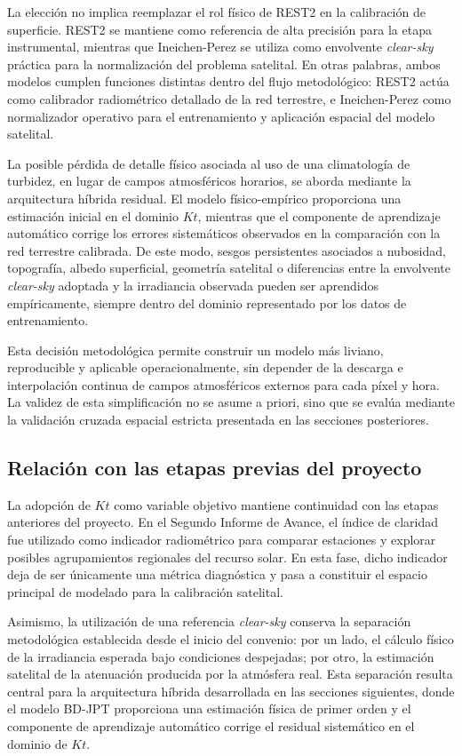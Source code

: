 \documentclass[../main.tex]{subfiles}
\begin{document}
La elección no implica reemplazar el rol físico de REST2 en la calibración de superficie. REST2 se mantiene como referencia de alta precisión para la etapa instrumental, mientras que Ineichen-Perez se utiliza como envolvente \textit{clear-sky} práctica para la normalización del problema satelital. En otras palabras, ambos modelos cumplen funciones distintas dentro del flujo metodológico: REST2 actúa como calibrador radiométrico detallado de la red terrestre, e Ineichen-Perez como normalizador operativo para el entrenamiento y aplicación espacial del modelo satelital.

La posible pérdida de detalle físico asociada al uso de una climatología de turbidez, en lugar de campos atmosféricos horarios, se aborda mediante la arquitectura híbrida residual. El modelo físico-empírico proporciona una estimación inicial en el dominio $Kt$, mientras que el componente de aprendizaje automático corrige los errores sistemáticos observados en la comparación con la red terrestre calibrada. De este modo, sesgos persistentes asociados a nubosidad, topografía, albedo superficial, geometría satelital o diferencias entre la envolvente \textit{clear-sky} adoptada y la irradiancia observada pueden ser aprendidos empíricamente, siempre dentro del dominio representado por los datos de entrenamiento.

Esta decisión metodológica permite construir un modelo más liviano, reproducible y aplicable operacionalmente, sin depender de la descarga e interpolación continua de campos atmosféricos externos para cada píxel y hora. La validez de esta simplificación no se asume a priori, sino que se evalúa mediante la validación cruzada espacial estricta presentada en las secciones posteriores.

\subsection{Relación con las etapas previas del proyecto}

La adopción de $Kt$ como variable objetivo mantiene continuidad con las etapas anteriores del proyecto. En el Segundo Informe de Avance, el índice de claridad fue utilizado como indicador radiométrico para comparar estaciones y explorar posibles agrupamientos regionales del recurso solar. En esta fase, dicho indicador deja de ser únicamente una métrica diagnóstica y pasa a constituir el espacio principal de modelado para la calibración satelital.

Asimismo, la utilización de una referencia \textit{clear-sky} conserva la separación metodológica establecida desde el inicio del convenio: por un lado, el cálculo físico de la irradiancia esperada bajo condiciones despejadas; por otro, la estimación satelital de la atenuación producida por la atmósfera real. Esta separación resulta central para la arquitectura híbrida desarrollada en las secciones siguientes, donde el modelo BD-JPT proporciona una estimación física de primer orden y el componente de aprendizaje automático corrige el residual sistemático en el dominio de $Kt$.
\end{document}
